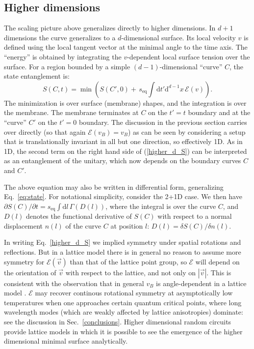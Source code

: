 \documentclass[aps,prx,twocolumn,superscriptaddress,floatfix,nofootinbib,prx]{revtex4}
\renewcommand{\>}{\right\rangle}
\newcommand{\<}{\left\langle}
\newcommand{\be}{\begin{equation}}
\newcommand{\ee}{\end{equation}}
\newcommand{\lf}{\left(}
\newcommand{\ri}{\right)}
\newcommand{\dd}{\mathrm{d}}
\newcommand{\seq}{s_\text{eq}}
\newcommand{\lt}{\mathcal{E}}
\begin{document}
\subsection{Higher dimensions}

The scaling picture above generalizes directly to higher dimensions.\cite{nahum}  In $d+1$ dimensions the curve generalizes to a $d$-dimensional surface.  Its local velocity $v$ is defined using the local tangent vector at the minimal angle to the time axis.  The ``energy'' is obtained by integrating the $v$-dependent local surface tension over the surface.  For a region bounded by a simple $(d-1)$-dimensional ``curve'' $C$, the state entanglement is:
\be\label{higher_d_S}
S(C,t)   =  \min \lf  S(C',0) + \, \seq \int \dd t' \dd^{d-1} x \,  \lt(v)
 \ri.
\ee
The minimization is over surface (membrane) shapes, and the integration is over the membrane.  The membrane terminates at $C$ on the $t'=t$ boundary and at the ``curve'' $C'$ on the $t'=0$ boundary. The discussion in the previous section carries over directly (so that again $\lt(v_B) = v_B$) as can be seen by considering a setup that is translationally invariant in all but one direction, so effectively 1D.  As in 1D, the second term on the right hand side of (\ref{higher_d_S}) can be interpreted as an entanglement of the unitary, which now  depends on the boundary curves $C$ and $C'$. 

The above equation may also be written in differential form, generalizing Eq.~\ref{eq:state}. For notational simplicity, consider the 2+1D case. We then have ${\partial S(C)/\partial t =\seq \int \dd l \, \Gamma (D(l))}$, where the integral is over the curve $C$, and $D(l)$ denotes the functional derivative of $S(C)$ with respect to a normal displacement $n(l)$  of the curve $C$ at position $l$: $D(l) = \delta S(C)/\delta n(l)$.

In writing Eq.~\ref{higher_d_S} we implied symmetry under spatial rotations and reflections.  But in a lattice model 
there is in general no reason to assume more symmetry for $\lt(\vec v)$ than that of the lattice point group, so $\lt$ will  depend on the orientation of $\vec v$ with respect to the lattice, and not only on $|\vec v|$.  This is consistent with the observation that in general $v_B$ is angle-dependent in a lattice model \cite{nahum3}.  $\lt$ may recover continous rotational symmetry at asymptotically low temperatures when one approaches certain quantum critical points, where long wavelength modes (which are weakly affected by lattice anisotropies) dominate: see the discussion in Sec.~\ref{conclusions}.  Higher dimensional random circuits \cite{nahum3} provide lattice models in which it is possible to see the emergence of the higher dimensional minimal surface analytically.
\end{document}
